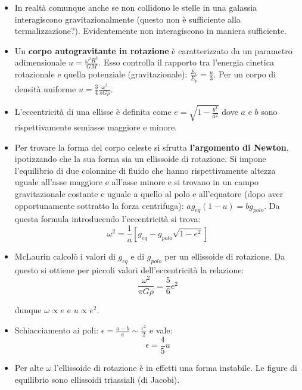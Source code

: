 \documentclass[11pt,a4paper]{article}
\begin{document}
\begin{itemize}
\item In realtà comunque anche se non collidono le stelle in una galassia interagiscono gravitazionalmente (questo non è sufficiente alla termalizzazione?). Evidentemente non interagiscono in maniera sufficiente.

\item Un \textbf{corpo autogravitante in rotazione} è caratterizzato da un parametro adimensionale $u = \frac{\omega^2 R^3}{G M}$. Esso controlla il rapporto tra l'energia cinetica rotazionale e quella potenziale (gravitazionale): $\frac{E_r}{E_p} = \frac{u}{3}$. Per un corpo di densità uniforme $u = \frac{3}{4} \frac{\omega^2}{\pi G \bar{\rho}}$.

\item L'eccentricità di una ellisse è definita come $e=\sqrt{1-\frac{b^2}{a^2}}$ dove $a$ e $b$ sono rispettivamente semiasse maggiore e minore.

\item Per trovare la forma del corpo celeste si sfrutta \textbf{l'argomento di Newton}, ipotizzando che la sua forma sia un ellissoide di rotazione. Si impone l'equilibrio di due colonnine di fluido che hanno rispettivamente altezza uguale all'asse maggiore e all'asse minore e si trovano in un campo gravitazionale costante e uguale a quello al polo e all'equatore (dopo aver opportunamente sottratto la forza centrifuga): $a g_{eq} (1 - u) = b g_{polo}$. Da questa formula introducendo l'eccentricità si trova:
\begin{equation}
\omega^2 = \frac{1}{a} \left[ g_{eq} - g_{polo} \sqrt{1-e^2} \right]
\end{equation}

\item McLaurin calcolò i valori di $g_{eq}$ e di $g_{polo}$ per un ellissoide di rotazione. Da questo si ottiene per piccoli valori dell'eccentricità la relazione:
\begin{equation}
\frac{\omega^2}{\pi G \rho} = \frac{5}{6} e^2
\end{equation}

dunque $\omega \propto e$ e $u \propto e^2$.

\item Schiacciamento ai poli: $\epsilon = \frac{a-b}{a} \sim \frac{\epsilon^2}{2}$ e vale: 
\begin{equation}
\epsilon = \frac{4}{5} u
\end{equation}

\item Per alte $\omega$ l'ellissoide di rotazione è in effetti una forma instabile. Le figure di equilibrio sono ellissoidi triassiali (di Jacobi). 


\end{itemize}
\end{document}
